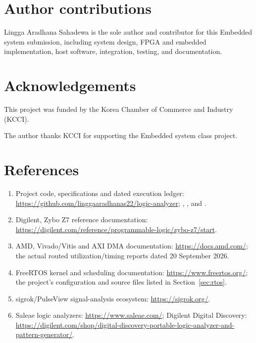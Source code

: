 \documentclass[11pt,a4paper]{article}
\newif\ifFPGA
\begin{document}
\section*{Author contributions}

\ifFPGA
Lingga Aradhana Sahadewa is the lead author and contributor for this FPGA
submission, responsible for overall system design, remaining FPGA work,
embedded and host software, integration, testing, and documentation.
Alvin Hadar contributed RTL design for the
capture FIFO/buffer and sample packing. Bagas Budhi Permana contributed RTL
design for trigger/edge detection and AXI-Stream packet framing.
\else
Lingga Aradhana Sahadewa is the sole author and contributor for this Embedded
system submission, including system design, FPGA and embedded implementation,
host software, integration, testing, and documentation.
\fi

\section*{Acknowledgements}

This project was funded by the Korea Chamber of Commerce and Industry (KCCI).
\ifFPGA
The authors thank KCCI for supporting the FPGA class project.
\else
The author thanks KCCI for supporting the Embedded system class project.
\fi

\section*{References}

\begin{enumerate}[leftmargin=1.5em,itemsep=2pt,topsep=2pt]
\item Project code, specifications and dated execution ledger:
\url{https://github.com/linggaaradhanas22/logic-analyzer};
, ,
 and .
\item Digilent, Zybo Z7 reference documentation:
\url{https://digilent.com/reference/programmable-logic/zybo-z7/start}.
\item AMD, Vivado/Vitis and AXI DMA documentation: \url{https://docs.amd.com/};
the actual routed utilization/timing reports dated 20 September 2026.
\item FreeRTOS kernel and scheduling documentation: \url{https://www.freertos.org/};
the project's configuration and source files listed in Section~\ref{sec:rtos}.
\item sigrok/PulseView signal-analysis ecosystem: \url{https://sigrok.org/}.
\item Saleae logic analyzers: \url{https://www.saleae.com/}; Digilent Digital
Discovery: \url{https://digilent.com/shop/digital-discovery-portable-logic-analyzer-and-pattern-generator/}.
\end{enumerate}
\end{document}
